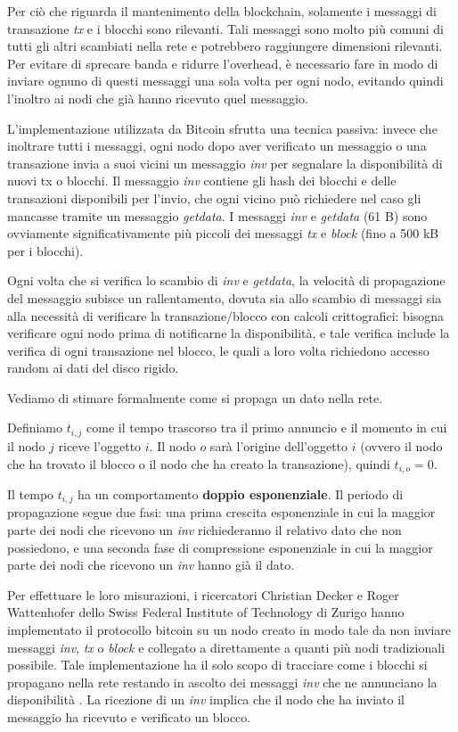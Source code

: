 Per ciò che riguarda il mantenimento della blockchain, solamente i messaggi di transazione \emph{tx} e i blocchi sono rilevanti. Tali messaggi sono molto più comuni di tutti gli altri scambiati nella rete e potrebbero raggiungere dimensioni rilevanti. Per evitare di sprecare banda e ridurre l'overhead, è necessario fare in modo di inviare ognuno di questi messaggi una sola volta per ogni nodo, evitando quindi l'inoltro ai nodi che già hanno ricevuto quel messaggio.

L'implementazione utilizzata da Bitcoin sfrutta una tecnica passiva: invece che inoltrare tutti i messaggi, ogni nodo dopo aver verificato un messaggio o una transazione invia a suoi vicini un messaggio \emph{inv} per segnalare la disponibilità di nuovi tx o blocchi. Il messaggio \emph{inv} contiene gli hash dei blocchi e delle transazioni disponibili per l'invio, che ogni vicino può richiedere nel caso gli mancasse tramite un messaggio \emph{getdata}. I messaggi \emph{inv} e \emph{getdata} (61 B) sono ovviamente significativamente più piccoli dei messaggi \emph{tx} e \emph{block} (fino a 500 kB per i blocchi).

Ogni volta che si verifica lo scambio di \emph{inv} e \emph{getdata}, la velocità di propagazione del messaggio subisce un rallentamento, dovuta sia allo scambio di messaggi sia alla necessità di verificare la transazione/blocco con calcoli crittografici: bisogna verificare ogni nodo prima di notificarne la disponibilità, e tale verifica include la verifica di ogni transazione nel blocco, le quali a loro volta richiedono accesso random ai dati del disco rigido.

Vediamo di stimare formalmente come si propaga un dato nella rete.

Definiamo $t_{i,j}$ come il tempo trascorso tra il primo annuncio e il momento in cui il nodo $j$ riceve l'oggetto $i$. Il nodo $o$ sarà l'origine dell'oggetto $i$ (ovvero il nodo che ha trovato il blocco o il nodo che ha creato la transazione), quindi $t_{i,o}=0$.

Il tempo $t_{i,j}$ ha un comportamento \textbf{doppio esponenziale}. Il periodo di propagazione segue due fasi: una prima crescita esponenziale in cui la maggior parte dei nodi che ricevono un \emph{inv} richiederanno il relativo dato che non possiedono, e una seconda fase di compressione esponenziale in cui la maggior parte dei nodi che ricevono un \emph{inv} hanno già il dato.

Per effettuare le loro misurazioni, i ricercatori Christian Decker e Roger Wattenhofer dello Swiss Federal Institute of Technology di Zurigo hanno implementato il protocollo bitcoin su un nodo creato in modo tale da non inviare messaggi \emph{inv}, \emph{tx} o \emph{block} e collegato a direttamente a quanti più nodi tradizionali possibile. Tale implementazione ha il solo scopo di tracciare come i blocchi si propagano nella rete restando in ascolto dei messaggi \emph{inv} che ne annunciano la disponibilità \cite{bitcoinpropagation}. La ricezione di un \emph{inv} implica che il nodo che ha inviato il messaggio ha ricevuto e verificato un blocco.

